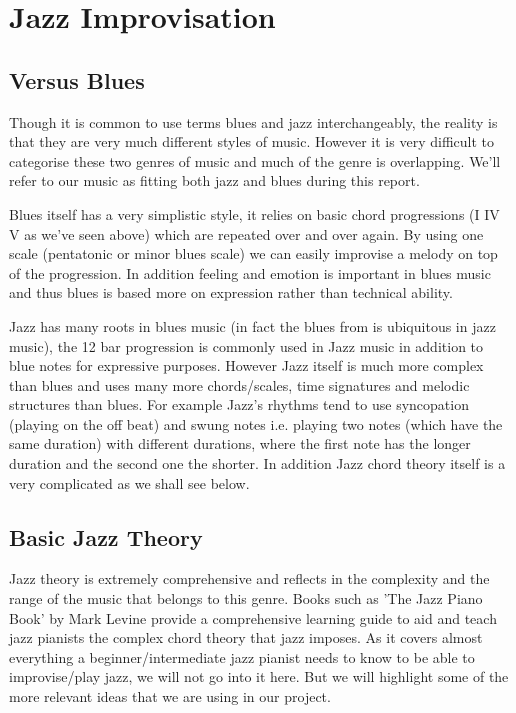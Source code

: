 \documentclass[pdftex,12pt,a4paper]{report}
\begin{document}
\section{Jazz Improvisation}

\subsection{Versus Blues}
Though it is common to use terms blues and jazz interchangeably, the reality is that they are very much different styles of music. However it is very difficult to categorise these two genres of music and much of the genre is overlapping. We'll refer to our music as fitting both jazz and blues during this report.

Blues itself has a very simplistic style, it relies on basic chord progressions (I IV V as we've seen above) which are repeated over and over again. By using one scale (pentatonic or minor blues scale) we can easily improvise a melody on top of the progression. In addition feeling and emotion is important in blues music and thus blues is based more on expression rather than technical ability. 

Jazz has many roots in blues music (in fact the blues from is ubiquitous in jazz music), the 12 bar progression is commonly used in Jazz music in addition to blue notes for expressive purposes. However Jazz itself is much more complex than blues and uses many more chords/scales, time signatures and melodic structures than blues. For example Jazz's rhythms tend to use syncopation (playing on the off beat) and swung notes i.e. playing two notes (which have the same duration) with different durations, where the first note has the longer duration and the second one the shorter. In addition Jazz chord theory itself is a very complicated as we shall see below.

\subsection{Basic Jazz Theory}
Jazz theory is extremely comprehensive and reflects in the complexity and the range of the music that belongs to this genre. Books such as 'The Jazz Piano Book' by Mark Levine provide a comprehensive learning guide to aid and teach jazz pianists the complex chord theory that jazz imposes. As it covers almost everything a beginner/intermediate jazz pianist needs to know to be able to improvise/play jazz, we will not go into it here. But we will highlight some of the more relevant ideas that we are using in our project.
\end{document}
